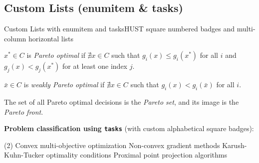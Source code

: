 \documentclass[aspectratio=43,10pt]{beamer}
\begin{document}
\subsection{Custom Lists (enumitem \& tasks)}
\begin{frame}[t]{Custom Lists with enumitem and tasks}{HUST square numbered badges and multi-column horizontal lists}
  \small
  \begin{definition}
    \begin{hustsqlist}
      \item $x^* \in C$ is \emph{Pareto optimal} if $\nexists x \in C$ such that $g_i(x) \le g_i(x^*)$ for all $i$ and $g_j(x) < g_j(x^*)$ for at least one index $j$. \label{def:pareto}
      \item $\bar{x} \in C$ is \emph{weakly Pareto optimal} if $\nexists x \in C$ such that $g_i(x) < g_i(\bar{x})$ for all $i$.
      \item The set of all Pareto optimal decisions is the \emph{Pareto set}, and its image is the \emph{Pareto front}.
    \end{hustsqlist}
  \end{definition}
  \vskip 2pt
  \textbf{Problem classification using \texttt{tasks}} (with custom alphabetical square badges):
  \begin{tasks}[label=\hustitemsq{\alph*}, label-width=18pt, item-indent=22pt, label-format={\bfseries\color{white}}](2)
    \task Convex multi-objective optimization
    \task Non-convex gradient methods
    \task Karush-Kuhn-Tucker optimality conditions
    \task Proximal point projection algorithms
  \end{tasks}
\end{frame}
\end{document}
